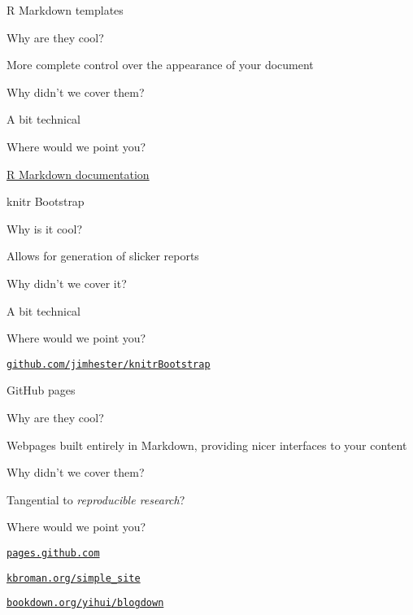 \documentclass[12pt,t]{beamer}
\begin{document}
\begin{frame}[c]{R Markdown templates}

  \bbi
\item[] Why are they cool?
  \bi
  \item More complete control over the appearance of your document
  \ei
\item[] Why didn't we cover them?
    \bi
    \item A bit technical
    \ei
\item[] Where would we point you?
    \bi
  \item
    \href{http://rmarkdown.rstudio.com/developer_document_templates.html}{R
        Markdown documentation}
   \ei
\ei


\end{frame}



\begin{frame}[c]{knitr Bootstrap}

  \bbi
\item[] Why is it cool?
  \bi
\item Allows for generation of slicker reports
  \ei
\item[] Why didn't we cover it?
    \bi
    \item A bit technical
    \ei
\item[] Where would we point you?
    \bi
  \item \href{https://github.com/jimhester/knitrBootstrap}{\tt github.com/jimhester/knitrBootstrap}
   \ei
\ei


\end{frame}



\begin{frame}[c]{GitHub pages}

  \bbi
\item[] Why are they cool?
  \bi
\item Webpages built entirely in Markdown, providing
   nicer interfaces to your content
  \ei
\item[] Why didn't we cover them?
    \bi
    \item Tangential to \emph{reproducible research}?
    \ei
\item[] Where would we point you?
    \bi
  \item \href{https://pages.github.com}{\tt pages.github.com}
  \item \href{http://kbroman.org/simple_site}{\tt kbroman.org/simple\_site}
  \item \href{https://bookdown.org/yihui/blogdown/}{\tt bookdown.org/yihui/blogdown}
   \ei
\ei


\end{frame}
\end{document}
